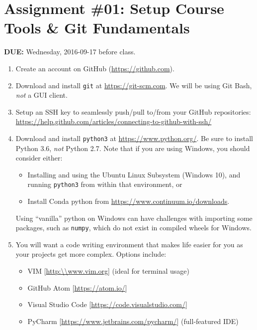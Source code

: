 


\section*{Assignment \#01: Setup Course Tools \& Git Fundamentals}

{\bf DUE:} Wednesday, 2016-09-17 before class.

\begin{enumerate}

\item Create an account on GitHub (\url{https://github.com}).

\item Download and install \verb+git+ at \url{https://git-scm.com}.  We will be
using Git Bash, \emph{not} a GUI client.

\item Setup an SSH key to seamlessly push/pull to/from your GitHub repositories:
\url{https://help.github.com/articles/connecting-to-github-with-ssh/}

\item Download and install \verb+python3+ at \url{https://www.python.org/}. Be sure to install Python 3.6, \emph{not} Python 2.7.
Note that if you are using Windows, you should consider either:
\begin{itemize}
  \item Installing and using the Ubuntu Linux Subsystem (Windows 10), and
  running \verb+python3+ from within that environment, or
  \item Install Conda python from \url{https://www.continuum.io/downloads}.
\end{itemize}
Using ``vanilla'' python on Windows can have challenges with importing some
packages, such as \verb+numpy+, which do not exist in compiled wheels for
Windows.

\item You will want a code writing environment that makes life easier for you as
your projects get more complex.  Options include:
\begin{itemize}
  \item VIM [\url{http:\\www.vim.org}] (ideal for terminal usage)
  \item GitHub Atom [\url{https://atom.io/}]
  \item Visual Studio Code [\url{https://code.visualstudio.com/}]
  \item PyCharm [\url{https://www.jetbrains.com/pycharm/}]  (full-featured IDE)
\end{itemize}


\end{enumerate}
